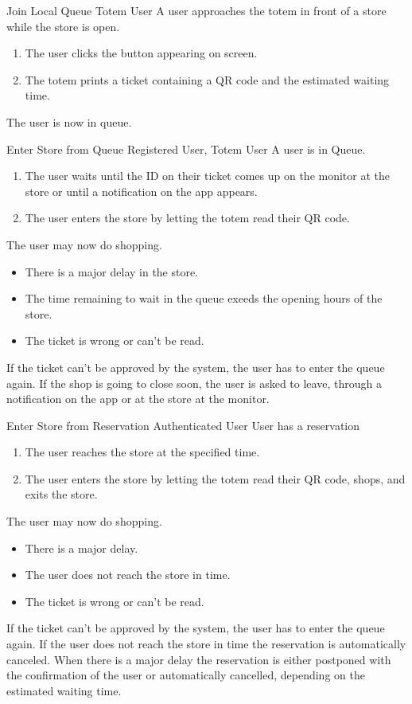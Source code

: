 \usecase
{Join Local Queue}
{Totem User}
{A user approaches the totem in front of a store while the store is open.}
{
    \begin{enumerate}
        \item The user clicks the button appearing on screen.
        \item The totem prints a ticket containing a QR code and the estimated waiting time.
    \end{enumerate}
}
{
    The user is now in queue.
}
{}
{}


\usecase
{Enter Store from Queue}
{Registered User, Totem User}
{A user is in Queue.}
{
    \begin{enumerate}
        \item The user waits until the ID on their ticket comes up on the monitor at the store or until a notification on the app appears.
        \item The user enters the store by letting the totem read their QR code.
    \end{enumerate}
}
{
    The user may now do shopping.
}
{
    \begin{itemize}
        \item There is a major delay in the store. 
        \item The time remaining to wait in the queue exeeds the opening hours of the store. 
        \item The ticket is wrong or can't be read.
    \end{itemize}
}
{
    If the ticket can't be approved by the system, the user has to enter the queue again.
    If the shop is going to close soon, the user is asked to leave, through a notification on the app or at the store at the monitor. 
}

\usecase
{Enter Store from Reservation}
{Authenticated User}
{User has a reservation}
{
        \begin{enumerate}
            \item The user reaches the store at the specified time.
            \item The user enters the store by letting the totem read their QR code, shops, and exits the store.
        \end{enumerate}
}
{
    The user may now do shopping.
}
{
    \begin{itemize}
        \item There is a major delay.
        \item The user does not reach the store in time.
        \item The ticket is wrong or can't be read.
    \end{itemize}
}
{
    If the ticket can't be approved by the system, the user has to enter the queue again.
    If the user does not reach the store in time the reservation is automatically canceled.
    When there is a major delay the reservation is either postponed with the confirmation of the user or automatically cancelled, depending on the estimated waiting time.
}

